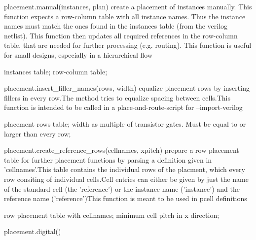 \begin{APIfunc}{placement.manual(instances, plan)}
    create a placement of instances manually. This function expects a row-column table with all instance names. Thus the instance names must match the ones found in the instances table (from the verilog netlist). This function then updates all required references in the row-column table, that are needed for further processing (e.g. routing). This function is useful for small designs, especially in a hierarchical flow
    \begin{APIparameters}
            instances table;
            row-column table;
    \end{APIparameters}
\end{APIfunc}
\begin{APIfunc}{placement.insert\_filler\_names(rows, width)}
    equalize placement rows by inserting fillers in every row.The method tries to equalize spacing between cells.This function is intended to be called in a place-and-route-script for --import-verilog
    \begin{APIparameters}
            placement rows table;
            width as multiple of transistor gates. Must be equal to or larger than every row;
    \end{APIparameters}
\end{APIfunc}
\begin{APIfunc}{placement.create\_reference\_rows(cellnames, xpitch)}
    prepare a row placement table for further placement functions by parsing a definition given in 'cellnames'.This table contains the individual rows of the placment, which every row consiting of individual cells.Cell entries can either be given by just the name of the standard cell (the 'reference') or the instance name ('instance') and the reference name ('reference')This function is meant to be used in pcell definitions
    \begin{APIparameters}
            row placement table with cellnames;
            minimum cell pitch in x direction;
    \end{APIparameters}
\end{APIfunc}
\begin{APIfunc}{placement.digital()}
    
    \begin{APIparameters}
    \end{APIparameters}
\end{APIfunc}
